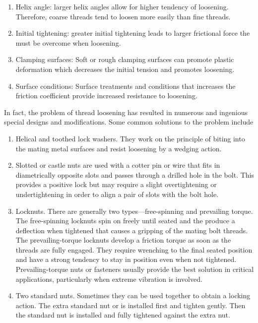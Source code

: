 \documentclass[a4paper,openany,12pt]{book}
\begin{document}
{{\begin{enumerate}
\item Helix angle: larger helix angles allow for higher tendency of
loosening. Therefore, coarse threads tend to loosen more easily than
fine threads.

\item Initial tightening: greater initial tightening leads to larger
frictional force the must be overcome when loosening.

\item Clamping surfaces: Soft or rough clamping surfaces can promote
plastic deformation which decreases the initial tension and promotes
loosening.

\item Surface conditions: Surface treatments and conditions that increases
the friction coefficient provide increased resistance to loosening.
\end{enumerate}

In fact, the problem of thread loosening has resulted in numerous and
ingenious special designs and modifications. Some common solutions to
the problem include

\begin{enumerate}
\item Helical and toothed lock washers. They work on the principle of
biting into the mating metal surfaces and resist loosening by a
wedging action.

\item Slotted or castle nuts are used with a cotter pin or wire that fits
in diametrically opposite slots and passes through a drilled hole in
the bolt. This provides a positive lock but may require a slight
overtightening or undertightening in order to align a pair of slots
with the bolt hole.

\item Locknuts. There are generally two types---free-spinning and
prevailing torque. The free-spinning locknuts spin on freely until
seated and the produce a deflection when tightened that causes a
gripping of the mating bolt threads. The prevailing-torque locknuts
develop a friction torque as soon as the threads are fully engaged.
They require wrenching to the final seated position and have a strong
tendency to stay in position even when not tightened.
Prevailing-torque nuts or fasteners usually provide the best solution
in critical applications, particularly when extreme vibration is
involved.

\item Two standard nuts. Sometimes they can be used together to obtain a
locking action. The extra standard nut or is installed first and
tighten gently. Then the standard nut is installed and fully
tightened against the extra nut.
\end{enumerate}

}}
\end{document}

